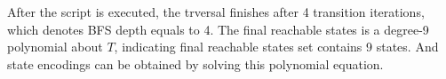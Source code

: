 \begin{Example}
\begin{figure}[hbt]
\end{figure}

After the script is executed, the trversal finishes after 4 
transition iterations, which denotes BFS depth equals to 4. The final reachable states 
is a degree-9 polynomial about $T$, indicating final reachable states set contains 9 states.
And state encodings can be obtained by solving this polynomial equation.


\end{Example}
